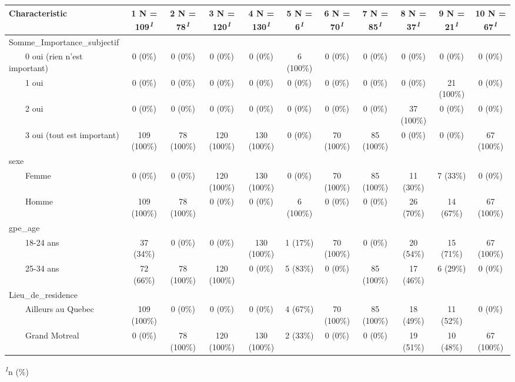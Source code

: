 \documentclass[
]{article}
\begin{document}
\begin{table}[!t]
\fontsize{12.0pt}{14.4pt}\selectfont
\begin{tabular*}{\linewidth}{@{\extracolsep{\fill}}lcccccccccc}
\toprule
\textbf{Characteristic} & \textbf{1}  N = 109\textsuperscript{\textit{1}} & \textbf{2}  N = 78\textsuperscript{\textit{1}} & \textbf{3}  N = 120\textsuperscript{\textit{1}} & \textbf{4}  N = 130\textsuperscript{\textit{1}} & \textbf{5}  N = 6\textsuperscript{\textit{1}} & \textbf{6}  N = 70\textsuperscript{\textit{1}} & \textbf{7}  N = 85\textsuperscript{\textit{1}} & \textbf{8}  N = 37\textsuperscript{\textit{1}} & \textbf{9}  N = 21\textsuperscript{\textit{1}} & \textbf{10}  N = 67\textsuperscript{\textit{1}} \\ 
\midrule\addlinespace[2.5pt]
Somme\_Importance\_subjectif &  &  &  &  &  &  &  &  &  &  \\ 
    0 oui (rien n’est important) & 0 (0\%) & 0 (0\%) & 0 (0\%) & 0 (0\%) & 6 (100\%) & 0 (0\%) & 0 (0\%) & 0 (0\%) & 0 (0\%) & 0 (0\%) \\ 
    1 oui & 0 (0\%) & 0 (0\%) & 0 (0\%) & 0 (0\%) & 0 (0\%) & 0 (0\%) & 0 (0\%) & 0 (0\%) & 21 (100\%) & 0 (0\%) \\ 
    2 oui & 0 (0\%) & 0 (0\%) & 0 (0\%) & 0 (0\%) & 0 (0\%) & 0 (0\%) & 0 (0\%) & 37 (100\%) & 0 (0\%) & 0 (0\%) \\ 
    3 oui (tout est important) & 109 (100\%) & 78 (100\%) & 120 (100\%) & 130 (100\%) & 0 (0\%) & 70 (100\%) & 85 (100\%) & 0 (0\%) & 0 (0\%) & 67 (100\%) \\ 
sexe &  &  &  &  &  &  &  &  &  &  \\ 
    Femme & 0 (0\%) & 0 (0\%) & 120 (100\%) & 130 (100\%) & 0 (0\%) & 70 (100\%) & 85 (100\%) & 11 (30\%) & 7 (33\%) & 0 (0\%) \\ 
    Homme & 109 (100\%) & 78 (100\%) & 0 (0\%) & 0 (0\%) & 6 (100\%) & 0 (0\%) & 0 (0\%) & 26 (70\%) & 14 (67\%) & 67 (100\%) \\ 
gpe\_age &  &  &  &  &  &  &  &  &  &  \\ 
    18-24 ans & 37 (34\%) & 0 (0\%) & 0 (0\%) & 130 (100\%) & 1 (17\%) & 70 (100\%) & 0 (0\%) & 20 (54\%) & 15 (71\%) & 67 (100\%) \\ 
    25-34 ans & 72 (66\%) & 78 (100\%) & 120 (100\%) & 0 (0\%) & 5 (83\%) & 0 (0\%) & 85 (100\%) & 17 (46\%) & 6 (29\%) & 0 (0\%) \\ 
Lieu\_de\_residence &  &  &  &  &  &  &  &  &  &  \\ 
    Ailleurs au Quebec & 109 (100\%) & 0 (0\%) & 0 (0\%) & 0 (0\%) & 4 (67\%) & 70 (100\%) & 85 (100\%) & 18 (49\%) & 11 (52\%) & 0 (0\%) \\ 
    Grand Motreal & 0 (0\%) & 78 (100\%) & 120 (100\%) & 130 (100\%) & 2 (33\%) & 0 (0\%) & 0 (0\%) & 19 (51\%) & 10 (48\%) & 67 (100\%) \\ 
\bottomrule
\end{tabular*}
\begin{minipage}{\linewidth}
\textsuperscript{\textit{1}}n (\%)\\
\end{minipage}
\end{table}
\end{document}
